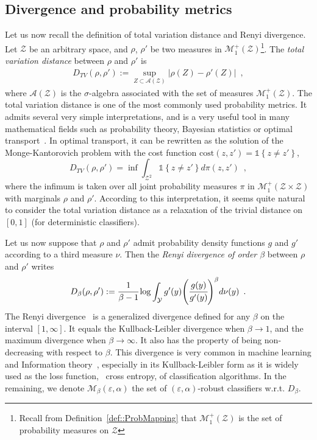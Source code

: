 \subsection{Divergence and probability metrics}
\label{section::Preliminaries}

Let us now recall the definition of total variation distance and Renyi divergence. Let $\mathcal{Z}$ be an arbitrary space, and $\rho$, $\rho'$ be two measures in $\mathcal{M}^+_1(\mathcal{Z})$\footnote{Recall from Definition~\ref{def::ProbMapping} that $\mathcal{M}^+_1(\mathcal{Z})$ is the set of probability measures on $\mathcal{Z}$}. 
The \emph{total variation distance} between $\rho$ and $\rho' $ is
\begin{align} 
D_{TV}\left(\rho  , \rho' \right) := \sup\limits_{Z \subset \mathcal{A} (\mathcal{Z})} \vert \rho (Z) - \rho' (Z) \vert \enspace,
\end{align}
where $\mathcal{A}(\mathcal{Z})$ is the $\sigma$-algebra associated with the set of measures $\mathcal{M}^+_1(\mathcal{Z})$.
The total variation distance is one of the most commonly used probability metrics. It admits several very simple interpretations, and is a very useful tool in many mathematical fields such as probability theory, Bayesian statistics or optimal transport~\citep{villani2003topics,robert2007bayesian,peyre2019computational}. In optimal transport, it can be rewritten as the solution of the Monge-Kantorovich problem with the cost function $\text{cost}({z},{z}') =\mathds{1}\left\{ {z}\neq {z}'\right\}$,
\begin{equation}
    D_{TV}(\rho  , \rho' ) = \inf\int_{\mathcal{Z}^{2}}\mathds{1}\left\{ {z} \neq {z}'\right\} d\pi({z},{z}') \enspace,
\end{equation} 
where the infimum is taken over all joint probability measures $\pi$ in $\mathcal{M}^+_1\left( \mathcal{Z}\times\mathcal{Z} \right)$ with marginals $\rho$ and $\rho' $. According to this interpretation, it seems quite natural to consider the total variation distance as a relaxation of the trivial distance on $[0,1]$ (for deterministic classifiers). 

Let us now suppose that $\rho$ and $\rho'$ admit probability density functions $g$ and $g'$ according to a third measure $\nu$. Then the \emph{Renyi divergence of order $\beta$} between $\rho$ and $\rho'$ writes
\begin{align}
D_{\beta}\left(\rho  , \rho' \right):=\cfrac{1}{\beta -1}\log \int_{\mathcal{Y}} g' (y)  \left(\cfrac{g(y)}{g' (y)}\right)^{\beta} d\nu(y)\enspace.
\end{align}
The Renyi divergence~\citep{renyi1961} is a generalized divergence defined for any $\beta$ on the interval $[1,\infty]$.  It equals the Kullback-Leibler divergence when $\beta \rightarrow 1$, and the maximum divergence when $\beta \rightarrow \infty$. It also has the property of being non-decreasing with respect to $\beta$. This divergence is very common in machine learning and Information theory~\citep{6832827}, especially in its Kullback-Leibler form as it is widely used as the loss function, \ie~cross entropy, of classification algorithms. In the remaining, we denote $\mathcal{M}_{\beta}\left(\varepsilon,\alpha\right)$ the set of $(\varepsilon,\alpha)$-robust classifiers w.r.t. $D_{\beta}$.


